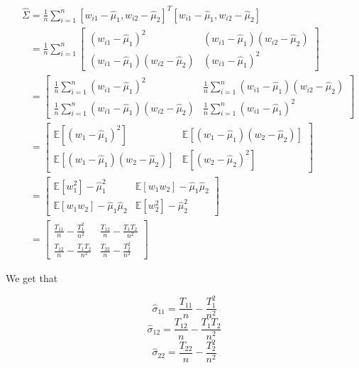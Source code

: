 \documentclass[11pt]{article}
\begin{document}
	\begin{align}
		&\hat{\Sigma} = \frac{1}{n} \sum_{i = 1}^n [w_{i1} - \hat{\mu}_1, w_{i2} - \hat{\mu}_2]^T[w_{i1} - \hat{\mu}_1, w_{i2} - \hat{\mu}_2]\nonumber\\
		&\phantom{\hat{\Sigma}} = \frac{1}{n} \sum_{i = 1}^n
		\begin{bmatrix}
			(w_{i1} - \hat{\mu}_1)^2 & (w_{i1} - \hat{\mu}_1)(w_{i2} - \hat{\mu}_2)\\
			(w_{i1} - \hat{\mu}_1)(w_{i2} - \hat{\mu}_2) & (w_{i1} - \hat{\mu}_1)^2
		\end{bmatrix}\nonumber\\
		&\phantom{\hat{\Sigma}} =
		\begin{bmatrix}
			\frac{1}{n} \sum_{i = 1}^n(w_{i1} - \hat{\mu}_1)^2 & \frac{1}{n} \sum_{i = 1}^n(w_{i1} - \hat{\mu}_1)(w_{i2} - \hat{\mu}_2)\\
			\frac{1}{n} \sum_{i = 1}^n(w_{i1} - \hat{\mu}_1)(w_{i2} - \hat{\mu}_2) & \frac{1}{n} \sum_{i = 1}^n(w_{i1} - \hat{\mu}_1)^2
		\end{bmatrix}\nonumber\\
		&\phantom{\hat{\Sigma}} =
		\begin{bmatrix}
			\mathbb{E}[(w_{1} - \hat{\mu}_1)^2] & \mathbb{E}[(w_{1} - \hat{\mu}_1)(w_{2} - \hat{\mu}_2)]\\
			\mathbb{E}[(w_{1} - \hat{\mu}_1)(w_{2} - \hat{\mu}_2)] & \mathbb{E}[(w_{2} - \hat{\mu}_2)^2]
		\end{bmatrix}\nonumber\\
		&\phantom{\hat{\Sigma}} =
		\begin{bmatrix}
			\mathbb{E}[w_{1}^2] - \hat{\mu}_1^2 & \mathbb{E}[w_{1}w_{2}] - \hat{\mu}_1\hat{\mu}_2\\
			\mathbb{E}[w_{1}w_{2}] - \hat{\mu}_1\hat{\mu}_2 & \mathbb{E}[w_{2}^2] - \hat{\mu}_2^2
		\end{bmatrix}\nonumber\\
		&\phantom{\hat{\Sigma}} =
		\begin{bmatrix}
			\frac{T_{11}}{n} - \frac{T_1^2}{n^2} & \frac{T_{12}}{n} - \frac{T_1T_2}{n^2}\\
			\frac{T_{12}}{n} - \frac{T_1T_2}{n^2} & \frac{T_{22}}{n} - \frac{T_2^2}{n^2}
		\end{bmatrix}\nonumber
	\end{align}
	
	We get that
	
	\[\hat{\sigma}_{11} = \frac{T_{11}}{n} - \frac{T_1^2}{n^2}\]
	\[\hat{\sigma}_{12} = \frac{T_{12}}{n} - \frac{T_1T_2}{n^2}\]
	\[\hat{\sigma}_{22} = \frac{T_{22}}{n} - \frac{T_2^2}{n^2}\]
\end{document}
